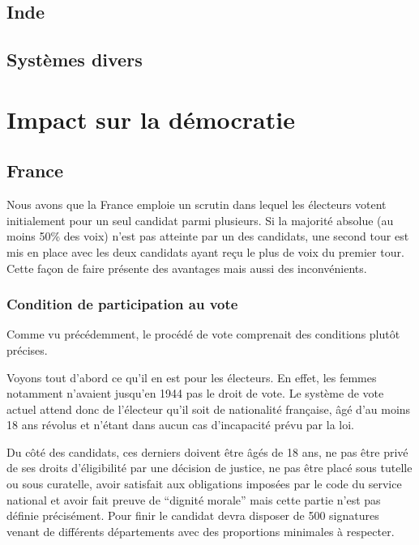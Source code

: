 \documentclass[12pt,a4paper]{report}
\begin{document}
\section{Inde} %

\section{Systèmes divers} %


\chapter{Impact sur la démocratie}

\section{France} %
Nous avons que la France emploie un scrutin dans lequel les électeurs votent initialement pour un seul candidat parmi plusieurs.
Si la majorité absolue (au moins 50\% des voix) n’est pas atteinte par un des candidats, une second tour est mis en place avec les deux candidats ayant reçu le plus de voix du premier tour.
Cette façon de faire présente des avantages mais aussi des inconvénients.

\subsection{Condition de participation au vote}

Comme vu précédemment, le procédé de vote comprenait des conditions plutôt précises.

Voyons tout d'abord ce qu'il en est pour les électeurs.
En effet, les femmes notamment n’avaient jusqu'en 1944 \nocite{wiki:droitvotefemmes} pas le droit de vote.
Le système de vote actuel attend donc de l'électeur qu’il soit de nationalité française, âgé d'au moins 18 ans révolus et n’étant dans aucun cas d’incapacité prévu par la loi.

Du côté des candidats, ces derniers doivent être âgés de 18 ans, ne pas être privé de ses droits d’éligibilité par une décision de justice, ne pas être placé sous tutelle ou sous curatelle, avoir satisfait aux obligations imposées par le code du service national et avoir fait preuve de “dignité morale” mais cette partie n’est pas définie précisément.
Pour finir le candidat devra disposer de 500 signatures venant de différents départements avec des proportions minimales à respecter.
\end{document}
